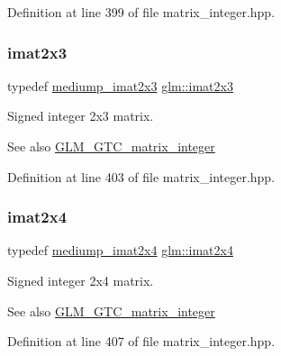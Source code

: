 Definition at line 399 of file matrix\+\_\+integer.\+hpp.

\mbox{\label{group__gtc__matrix__integer_ga143bc5177bac9991d84b70da03952516}} 
\subsubsection{\texorpdfstring{imat2x3}{imat2x3}}
{\footnotesize\ttfamily typedef \hyperlink{group__gtc__matrix__integer_gabc92c714c2d257213c5b0771669df177}{mediump\+\_\+imat2x3} \hyperlink{group__gtc__matrix__integer_ga143bc5177bac9991d84b70da03952516}{glm\+::imat2x3}}

Signed integer 2x3 matrix. \begin{DoxySeeAlso}{See also}
\hyperlink{group__gtc__matrix__integer}{G\+L\+M\+\_\+\+G\+T\+C\+\_\+matrix\+\_\+integer} 
\end{DoxySeeAlso}


Definition at line 403 of file matrix\+\_\+integer.\+hpp.

\mbox{\label{group__gtc__matrix__integer_gafe2d058e164fd1badace451ffcf4ae46}} 
\subsubsection{\texorpdfstring{imat2x4}{imat2x4}}
{\footnotesize\ttfamily typedef \hyperlink{group__gtc__matrix__integer_ga90b020de8489a1d4424c0ffcc17c83dd}{mediump\+\_\+imat2x4} \hyperlink{group__gtc__matrix__integer_gafe2d058e164fd1badace451ffcf4ae46}{glm\+::imat2x4}}

Signed integer 2x4 matrix. \begin{DoxySeeAlso}{See also}
\hyperlink{group__gtc__matrix__integer}{G\+L\+M\+\_\+\+G\+T\+C\+\_\+matrix\+\_\+integer} 
\end{DoxySeeAlso}


Definition at line 407 of file matrix\+\_\+integer.\+hpp.

